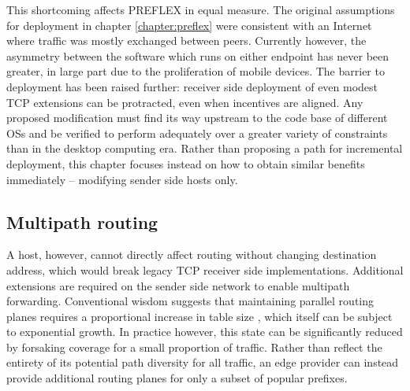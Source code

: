 This shortcoming affects \ac{PREFLEX} in equal measure.
The original assumptions for deployment in chapter \ref{chapter:preflex} were consistent with an Internet where traffic was mostly exchanged between peers.
Currently however, the asymmetry between the software which runs on either endpoint has never been greater, in large part due to the proliferation of mobile devices.
The barrier to deployment has been raised further: receiver side deployment of even modest \ac{TCP} extensions can be protracted, even when incentives are aligned.
Any proposed modification must find its way upstream to the code base of different \acp{OS} and be verified to perform adequately over a greater variety of constraints than in the desktop computing era.
Rather than proposing a path for incremental deployment, this chapter focuses instead on how to obtain similar benefits immediately -- modifying sender side hosts only. 

\subsection{Multipath routing}

A host, however, cannot directly affect routing without changing destination address, which would break legacy \ac{TCP} receiver side implementations. Additional extensions are required on the sender side network to enable multipath forwarding.
Conventional wisdom suggests that maintaining parallel routing planes requires a proportional increase in table size \cite{NingWang:2008p145}, which itself can be subject to exponential growth.
In practice however, this state can be significantly reduced by forsaking coverage for a small proportion of traffic.
Rather than reflect the entirety of its potential path diversity for all traffic, an edge provider can instead provide additional routing planes for only a subset of popular prefixes.

